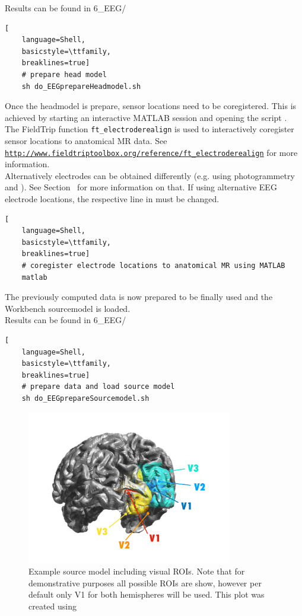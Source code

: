 \documentclass[12pt,a4paper]{scrartcl}
\begin{document}
\noindent Results can be found in 6\_EEG/\\
\begin{lstlisting}[
    language=Shell,
    basicstyle=\ttfamily,
    breaklines=true]
    # prepare head model
    sh do_EEGprepareHeadmodel.sh
\end{lstlisting}
Once the headmodel is prepare, sensor locations need to be coregistered. This is achieved by starting an interactive MATLAB session and opening the script \texttt{}. The FieldTrip function \texttt{ft\_electroderealign} is used to interactively coregister sensor locations to anatomical MR data. See \href{http://www.fieldtriptoolbox.org/reference/ft\_electroderealign}{\nolinkurl{http://www.fieldtriptoolbox.org/reference/ft\_electroderealign}} for more information.\\

\noindent Alternatively electrodes can be obtained differently (e.g. using photogrammetry and \texttt{}). See Section~ for more information on that. If using alternative EEG electrode locations, the respective line in \texttt{} must be changed.

\begin{lstlisting}[
    language=Shell,
    basicstyle=\ttfamily,
    breaklines=true]
    # coregister electrode locations to anatomical MR using MATLAB
    matlab
\end{lstlisting}
The previously computed data is now prepared to be finally used and the Workbench sourcemodel is loaded.\\

\noindent Results can be found in 6\_EEG/\\
\begin{lstlisting}[
    language=Shell,
    basicstyle=\ttfamily,
    breaklines=true]
    # prepare data and load source model
    sh do_EEGprepareSourcemodel.sh
\end{lstlisting}
\begin{figure}
\begin{center}
\includegraphics[width=0.8\textwidth]{exampleSourcemodel}
\caption[Example source model]{Example source model including visual ROIs. Note that for demonstrative purposes all possible ROIs are show, however per default only V1 for both hemispheres will be used. This plot was created using \texttt{}}
\label{fig:exampleSourcemodel}
\end{center}
\end{figure}
\FloatBarrier
\end{document}
